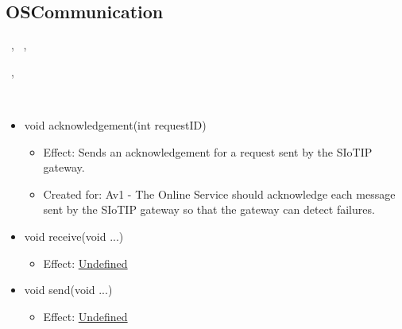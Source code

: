  \subsection{OSCommunication}\label{int:GatewayGatewayOnlineServiceBrokerOSBrokerLogicOSCommunication}
    \begin{description}
      \item[Provided by:] \iconcomponent{}~, \iconcomponent{}~, \iconcomponent{}~
      \item[Required by:] \iconcomponent{}~, \iconcomponent{}~
      \item[Operations:] ~
    \begin{itemize}[noitemsep,nolistsep,leftmargin=-.25cm]
      \item \textsf{void acknowledgement(int requestID)}
        \begin{itemize}[noitemsep,nolistsep]
           \item Effect: Sends an acknowledgement for a request sent by the SIoTIP gateway.
\item Created for: Av1 - The Online Service should acknowledge each message sent by the SIoTIP gateway so that the gateway can detect failures.
        \end{itemize}
      \item \textsf{void receive(void ...)}
        \begin{itemize}[noitemsep,nolistsep]
           \item Effect: {\colorbox{red!30}{\underline{Undefined}}}
        \end{itemize}
      \item \textsf{void send(void ...)}
        \begin{itemize}[noitemsep,nolistsep]
           \item Effect: {\colorbox{red!30}{\underline{Undefined}}}
        \end{itemize}
    \end{itemize}
    \end{description}

